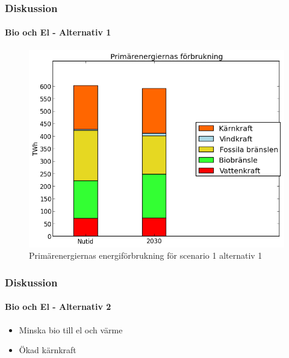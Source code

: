 \documentclass{beamer}
\begin{document}
\begin{frame}
	\frametitle{Diskussion}
	\framesubtitle{Bio och El - Alternativ 1}
	\begin{figure}[h!]
       \centering
       \includegraphics[scale=0.5]{scen1a1energidiagram.png}
       \caption{Primärenergiernas energiförbrukning för scenario 1 alternativ 1}
       \label{fig:scen1a1energidiagram}
	\end{figure}
\end{frame}

\begin{frame}
	\frametitle{Diskussion}
	\framesubtitle{Bio och El - Alternativ 2}
	\begin{itemize}
		\item{Minska bio till el och värme}
		\item{Ökad kärnkraft}
	\end{itemize}
\end{frame}
\end{document}
